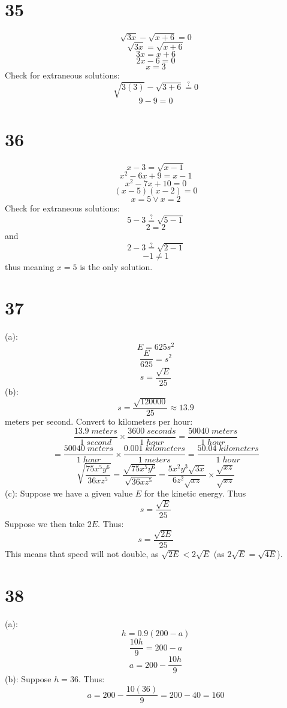 \documentclass{article}
\theoremstyle{definition}
\newcommand{\?}{\stackrel{?}{=}}
\begin{document}
\section*{35}
\[ \sqrt{3x}-\sqrt{x+6}=0 \]
\[ \sqrt{3x}=\sqrt{x+6} \]
\[ 3x=x+6 \] \[ 2x-6=0 \] \[ x=3 \]
Check for extraneous solutions:
\[ \sqrt{3(3)}-\sqrt{3+6}\? 0 \] \[ 9-9=0 \] 

\section*{36}
\[ x-3=\sqrt{x-1} \] \[ x^2-6x+9=x-1 \] \[ x^2-7x+10=0 \] \[ (x-5)(x-2)=0 \] \[ x=5\vee x=2 \]
Check for extraneous solutions:
\[ 5-3\? \sqrt{5-1} \] \[ 2=2 \] and \[ 2-3\? \sqrt{2-1} \] \[ -1\ne 1 \] thus meaning $x=5$ is the only solution.

\section*{37}
(a): \[ E=625s^2 \] \[ \frac{E}{625}=s^2 \] \[ s=\frac{\sqrt{E}}{25} \]
(b): \[ s=\frac{\sqrt{120000}}{25}\approx 13.9 \] meters per second. Convert to kilometers per hour:
\[ \frac{13.9\; meters}{1\; second}\times \frac{3600\; seconds}{1\; hour}=\frac{50040\; meters}{1\; hour} \]
\[ =\frac{50040\; meters}{1\; hour}\times\frac{0.001\; kilometers}{1\; meters}=\frac{50.04\; kilometers}{1\; hour} \]
\[ \sqrt{\frac{75x^5y^6}{36xz^5}}=\frac{\sqrt{75x^5y^6}}{\sqrt{36xz^5}}=\frac{5x^2y^3\sqrt{3x}}{6z^2\sqrt{xz}}\times\frac{\sqrt{xz}}{\sqrt{xz}} \]
(c): Suppose we have a given value $E$ for the kinetic energy. Thus \[ s=\frac{\sqrt{E}}{25} \] Suppose we then take $2E$. Thus:
\[ s=\frac{\sqrt{2E}}{25} \] This means that speed will not double, as $\sqrt{2E}<2\sqrt{E}$ (as $2\sqrt{E}=\sqrt{4E}$).

\section*{38}
(a): \[ h=0.9(200-a) \] \[ \frac{10h}{9}=200-a \] \[ a=200-\frac{10h}{9} \]
(b): Suppose $h=36$. Thus: \[ a=200-\frac{10(36)}{9}=200-40=160 \]
\end{document}
